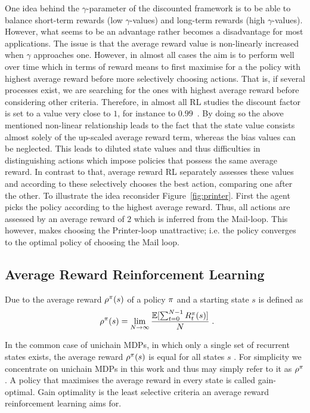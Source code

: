 \documentclass[envcountsame]{llncs}
\begin{document}
One idea behind the \(\gamma\)-parameter of the discounted framework is to be able to balance
short-term rewards (low \(\gamma\)-values) and long-term rewards (high \(\gamma\)-values). However,
what seems to be an advantage rather becomes a disadvantage for most applications. The issue is that
the average reward value is non-linearly increased when \(\gamma\) approaches one. However, in
almost all cases the aim is to perform well over time which in terms of reward means to first
maximise for a the policy with highest average reward before more selectively choosing actions. That
is, if several processes exist, we are searching for the ones with highest average reward before
considering other criteria.
%
Therefore, in almost all RL studies the discount factor is set to a value very close to \(1\), for
instance to \(0.99\)~\cite[e.g.]{mnih2015human,mnih2016asynchronous,Lillicrap15}.
%
By doing so the above mentioned non-linear relationship leads to the fact that the state value
consists almost solely of the up-scaled average reward term, whereas the bias values can be
neglected. This leads to diluted state values and thus difficulties in distinguishing actions which
impose policies that possess the same average reward.
%
In contrast to that, average reward RL separately assesses these values and according to these
selectively chooses the best action, comparing one after the other.
%
To illustrate the idea reconsider Figure~\ref{fig:printer}. First the agent picks the policy
according to the highest average reward. Thus, all actions are assessed by an average reward of
\(2\) which is inferred from the Mail-loop. This however, makes choosing the Printer-loop
unattractive; i.e. the policy converges to the optimal policy of choosing the Mail loop.


\subsection{Average Reward Reinforcement Learning}

Due to \cite{Howard64} the average reward \(\rho^{\pi}(s)\) of a policy \(\pi\) and a starting
state \(s\) is defined as
\begin{align*}
  \avgrew^{\pol}(s) = \lim_{N \to \infty} \frac{\E [\sum_{t=0}^{N-1}R_{t}^{\pol}(s)]}{N}\tpkt
\end{align*}


In the common case of unichain MDPs, in which only a single set of recurrent states exists, the
average reward \(\rho^{\pi}(s)\) is equal for all states \(s\)
\citep{Mahadevan96_AverageRewardReinforcementLearningFoundationsAlgorithmsAndEmpiricalResults,Puterman94}.
For simplicity we concentrate on unichain MDPs in this work and thus may simply refer to it as
\(\rho^{\pi}\). A policy that maximises the average reward in every state is called
gain-optimal. Gain optimality is the least selective criteria an average reward reinforcement
learning aims for.
\end{document}
